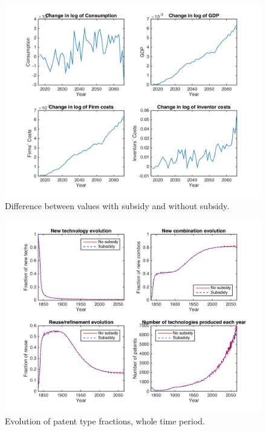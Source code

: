 \documentclass[a4paper,11pt]{article}
\begin{document}
\begin{figure}[h!]
\centering
\includegraphics[scale=.6]{figures/aggregates2016_diffNT}
\caption{Difference between values with subsidy and without subsidy.}
\end{figure}

\begin{figure}[h!]
\centering
\includegraphics[scale=.6]{figures/patentsNT}
\caption{Evolution of patent type fractions, whole time period.}
\end{figure}
\end{document}
